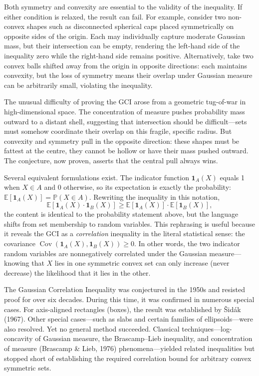 Both symmetry and convexity are essential to the validity of the inequality. If either condition is relaxed, the result can fail. For example, consider two non-convex shapes such as disconnected spherical caps placed symmetrically on opposite sides of the origin. Each may individually capture moderate Gaussian mass, but their intersection can be empty, rendering the left-hand side of the inequality zero while the right-hand side remains positive. Alternatively, take two convex balls shifted away from the origin in opposite directions: each maintains convexity, but the loss of symmetry means their overlap under Gaussian measure can be arbitrarily small, violating the inequality.

The unusual difficulty of proving the GCI arose from a geometric tug-of-war in high-dimensional space. The concentration of measure pushes probability mass outward to a distant shell, suggesting that intersection should be difficult—sets must somehow coordinate their overlap on this fragile, specific radius. But convexity and symmetry pull in the opposite direction: these shapes must be \QSOpen{}fattest\QSClose{} at the centre, they cannot be hollow or have their mass pushed outward. The conjecture, now proven, asserts that the central pull always wins.

Several equivalent formulations exist. The indicator function \( \mathbf{1}_A(X) \) equals 1 when \( X \in A \) and 0 otherwise, so its expectation is exactly the probability: \( \mathbb{E}[\mathbf{1}_A(X)] = \mathbb{P}(X \in A) \). Rewriting the inequality in this notation,
\[
\mathbb{E}[\mathbf{1}_A(X) \cdot \mathbf{1}_B(X)] \geq \mathbb{E}[\mathbf{1}_A(X)] \cdot \mathbb{E}[\mathbf{1}_B(X)],
\]
the content is identical to the probability statement above, but the language shifts from set membership to random variables. This rephrasing is useful because it reveals the GCI as a \emph{correlation} inequality in the literal statistical sense: the covariance \( \operatorname{Cov}(\mathbf{1}_A(X), \mathbf{1}_B(X)) \geq 0 \). In other words, the two indicator random variables are nonnegatively correlated under the Gaussian measure—knowing that \( X \) lies in one symmetric convex set can only increase (never decrease) the likelihood that it lies in the other.

The Gaussian Correlation Inequality was conjectured in the 1950s and resisted proof for over six decades. During this time, it was confirmed in numerous special cases. For axis-aligned rectangles (boxes), the result was established by \v{S}id\'ak (1967). Other special cases—such as slabs and certain families of ellipsoids—were also resolved. Yet no general method succeeded. Classical techniques—log-concavity of Gaussian measure, the Brascamp–Lieb inequality, and concentration of measure (Brascamp \& Lieb, 1976) phenomena—yielded related inequalities but stopped short of establishing the required correlation bound for arbitrary convex symmetric sets.

